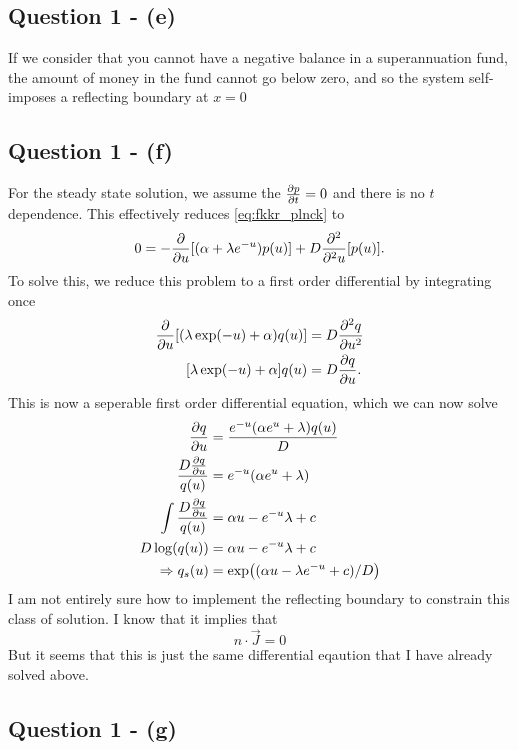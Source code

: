 \documentclass[11pt,a4paper]{article}
\begin{document}
\subsection{Question 1 - (e)}
\label{sec:question1:subsec:parte}
If we consider that you cannot have a negative balance in a superannuation fund, the amount of money in the fund cannot go below zero, and so the system self-imposes a reflecting boundary at $x=0$

\subsection{Question 1 - (f)}
\label{sec:question1:subsec:partf}
For the steady state solution, we assume the $\pdv{p}{t} = 0$ and there is no $t$ dependence. This effectively reduces \eqref{eq:fkkr_plnck} to 
$$   0 = - \pdv{u} [(\alpha + \lambda e^{-u}) p(u)] + D                 \frac{\partial^2}{\partial^2  u} [p(u)].
$$ 
To solve this, we reduce this problem to a first order differential by integrating once
\begin{align*}
  \pdv{u} [(\lambda \exp(-u) + \alpha) q(u)] &= D \pdv[2]{q}{u} \\
  [\lambda \exp(- u) + \alpha] q(u) &= D \pdv{q}{u}.
\end{align*}
This is now a seperable first order differential equation, which we can now solve 
\begin{align*}
  \pdv{q}{u} &= \frac{e^{-u}( \alpha e^u + \lambda )q(u) }{D} \\
  \frac{D \pdv{q}{u}}{q(u)} &= e^{-u} ( \alpha e^u +\lambda) \\
  \int \frac{D \pdv{q}{u}}{q(u)} &= \alpha u - e^{-u} \lambda + c \\
  D \log(q(u)) &= \alpha u - e^{-u} \lambda + c \\
  \Rightarrow q_s(u) &= \exp((\alpha u - \lambda e^{-u} + c)/D)
\end{align*}
I am not entirely sure how to implement the reflecting boundary to constrain this class of solution. I know that it implies that 
$$ n \cdot \vec{J} = 0 $$
But it seems that this is just the same differential eqaution that I have already solved above. 
\subsection{Question 1 - (g)}
\label{sec:question1:subsec:partg}
\end{document}
